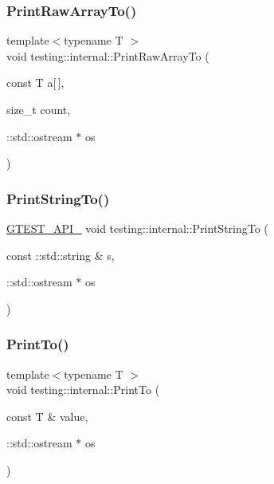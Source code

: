 \mbox{\label{namespacetesting_1_1internal_ad3013b6b4c825edee9fe18ff1d982faa}} 
\subsubsection{\texorpdfstring{PrintRawArrayTo()}{PrintRawArrayTo()}}
{\footnotesize\ttfamily template$<$typename T $>$ \\
void testing\+::internal\+::\+Print\+Raw\+Array\+To (\begin{DoxyParamCaption}\item[{const T}]{a\mbox{[}$\,$\mbox{]},  }\item[{size\+\_\+t}]{count,  }\item[{\+::std\+::ostream $\ast$}]{os }\end{DoxyParamCaption})}

\mbox{\label{namespacetesting_1_1internal_a8b53e46cea3f8bdfc9342057c4f6ba62}} 
\subsubsection{\texorpdfstring{PrintStringTo()}{PrintStringTo()}}
{\footnotesize\ttfamily \mbox{\hyperlink{gtest-port_8h_aa73be6f0ba4a7456180a94904ce17790}{G\+T\+E\+S\+T\+\_\+\+A\+P\+I\+\_\+}} void testing\+::internal\+::\+Print\+String\+To (\begin{DoxyParamCaption}\item[{const \+::std\+::string \&}]{s,  }\item[{\+::std\+::ostream $\ast$}]{os }\end{DoxyParamCaption})}

\mbox{\label{namespacetesting_1_1internal_adb3c27150dbe661db0e0c4be27533460}} 
\subsubsection{\texorpdfstring{PrintTo()}{PrintTo()}\hspace{0.1cm}{\footnotesize\ttfamily [1/16]}}
{\footnotesize\ttfamily template$<$typename T $>$ \\
void testing\+::internal\+::\+Print\+To (\begin{DoxyParamCaption}\item[{const T \&}]{value,  }\item[{\+::std\+::ostream $\ast$}]{os }\end{DoxyParamCaption})}

